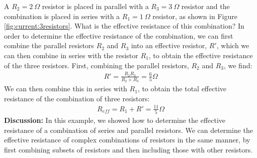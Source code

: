 \begin{example}{A $R_2=\SI{2}{\Omega}$ resistor is placed in parallel with a $R_3=\SI{3}{\Omega}$ resistor and the combination is placed in series with a $R_1=\SI{1}{\Omega}$ resistor, as shown in Figure \ref{fig:current:3resistors}. What is the effective resistance of this combination?}
In order to determine the effective resistance of the combination, we can first combine the parallel resistors $R_2$ and $R_3$ into an effective resistor, $R'$, which we can then combine in series with the resistor $R_1$, to obtain the effective resistance of the three resistors. First, combining the parallel resistors, $R_2$ and $R_3$, we find:
\begin{align*}
R'=\frac{R_2R_3}{R_2+R_3}=\frac{6}{5}\si{\Omega}
\end{align*}
We can then combine this in series with $R_1$, to obtain the total effective resistance of the combination of three resistors:
\begin{align*}
R_{eff}=R_1+R'=\frac{11}{5}\si{\Omega}
\end{align*}
\textbf{Discussion: }In this example, we showed how to determine the effective resistance of a combination of series and parallel resistors. We can determine the effective resistance of complex combinations of resistors in the same manner, by first combining subsets of resistors and then including those with other resistors.
\end{example}


